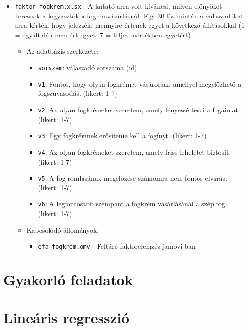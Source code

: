\documentclass[
  letterpaper,
]{krantz}
\providecommand{\tightlist}{%
  \setlength{\itemsep}{0pt}\setlength{\parskip}{0pt}}\usepackage{longtable,booktabs,array}
\begin{document}
\begin{itemize}
\item
  \texttt{faktor\_fogkrem.xlsx} - A kutató arra volt kíváncsi, milyen
  előnyöket keresnek a fogyasztók a fogrémvásárlásnál. Egy 30 fős mintán
  a válaszadókat arra kérték, hogy jelezzék, mennyire értenek egyet a
  következő állításokkal (1 = egyáltalán nem ért egyet; 7 = teljes
  mértékben egyetért)

  \begin{itemize}
  \item
    Az adatbázis szerkezete:

    \begin{itemize}
    \tightlist
    \item
      \texttt{sorszam}: válaszadó sorszáma (id)
    \item
      \texttt{v1}: Fontos, hogy olyan fogkrémet vásároljak, amellyel
      megelőzhető a fogszuvasodás. (likert: 1-7)
    \item
      \texttt{v2}: Az olyan fogkrémeket szeretem, amely fényessé teszi a
      fogaimat. (likert: 1-7)
    \item
      \texttt{v3}: Egy fogkrémnek erősítenie kell a fogínyt. (likert:
      1-7)
    \item
      \texttt{v4}: Az olyan fogkrémeket szeretem, amely friss leheletet
      biztosít. (likert: 1-7)
    \item
      \texttt{v5}: A fog romlásának megelőzése számomra nem fontos
      elvárás. (likert: 1-7)
    \item
      \texttt{v6}: A legfontosabb szempont a fogkrém vásárlásánál a szép
      fog. (likert: 1-7)
    \end{itemize}
  \item
    Kapcsolódó állományok:

    \begin{itemize}
    \tightlist
    \item
      \texttt{efa\_fogkrem.omv} - Feltáró faktorelemzés jamovi-ban
    \end{itemize}
  \end{itemize}
\end{itemize}

\hypertarget{sec-gyakorlo-feladatok}{%
\chapter{Gyakorló feladatok}\label{sec-gyakorlo-feladatok}}

\hypertarget{lineuxe1ris-regressziuxf3-1}{%
\chapter{Lineáris regresszió}\label{lineuxe1ris-regressziuxf3-1}}
\end{document}
